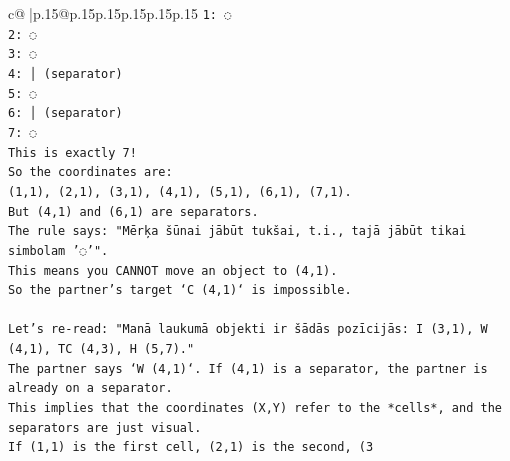 \documentclass{article}
\begin{document}
{\begin{supertabular}{c@{$\;$}|p{.15\linewidth}@{}p{.15\linewidth}p{.15\linewidth}p{.15\linewidth}p{.15\linewidth}p{.15\linewidth}}
{{{\texttt{1: ◌} \\
\texttt{2: ◌} \\
\texttt{3: ◌} \\
\texttt{4: │ (separator)} \\
\texttt{5: ◌} \\
\texttt{6: │ (separator)} \\
\texttt{7: ◌} \\
\texttt{This is exactly 7!} \\
\texttt{So the coordinates are:} \\
\texttt{(1,1), (2,1), (3,1), (4,1), (5,1), (6,1), (7,1).} \\
\texttt{But (4,1) and (6,1) are separators.} \\
\texttt{The rule says: "Mērķa šūnai jābūt tukšai, t.i., tajā jābūt tikai simbolam '◌'".} \\
\texttt{This means you CANNOT move an object to (4,1).} \\
\texttt{So the partner's target `C (4,1)` is impossible.} \\
\\ 
\texttt{Let's re{-}read: "Manā laukumā objekti ir šādās pozīcijās: I (3,1), W (4,1), TC (4,3), H (5,7)."} \\
\texttt{The partner says `W (4,1)`. If (4,1) is a separator, the partner is already on a separator.} \\
\texttt{This implies that the coordinates (X,Y) refer to the *cells*, and the separators are just visual.} \\
\texttt{If (1,1) is the first cell, (2,1) is the second, (3} \\
            }
        }
    }
     \\ \\


\end{supertabular}}
\end{document}
